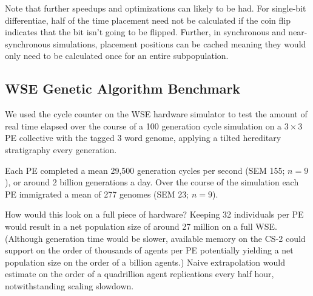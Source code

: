 Note that further speedups and optimizations can likely to be had.
For single-bit differentiae, half of the time placement need not be calculated if the coin flip indicates that the bit isn't going to be flipped.
Further, in synchronous and near-synchronous simulations, placement positions can be cached meaning they would only need to be calculated once for an entire subpopulation.

\subsection{WSE Genetic Algorithm Benchmark}

We used the cycle counter on the WSE hardware simulator to test the amount of real time elapsed over the course of a 100 generation cycle simulation on a $3\times3$ PE collective with the tagged 3 word genome, applying a tilted hereditary stratigraphy every generation.

Each PE completed a mean 29,500 generation cycles per second (SEM 155; $n=9$), or around 2 billion generations a day.
Over the course of the simulation each PE immigrated a mean of 277 genomes (SEM 23; $n=9$).

How would this look on a full piece of hardware?
Keeping 32 individuals per PE would result in a net population size of around 27 million on a full WSE.
(Although generation time would be slower, available memory on the CS-2 could support on the order of thousands of agents per PE potentially yielding a net population size on the order of a billion agents.)
Naive extrapolation would estimate on the order of a quadrillion agent replications every half hour, notwithstanding scaling slowdown.

